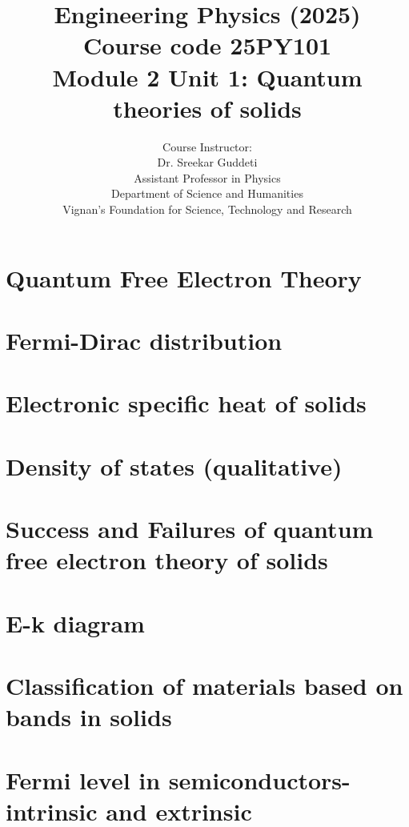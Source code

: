 \documentclass[aspectratio=169]{beamer}
\title[Engineering Physics]{Engineering Physics (2025) \\ Course code
	25PY101 \\ Module 2 Unit 1: Quantum theories of solids}
\author{Course Instructor:\\ 
	{\color{VignanBlue} Dr. Sreekar Guddeti}\\
	Assistant Professor in Physics\\
	Department of Science and Humanities \\
	{\color{VignanRed}Vignan's Foundation for Science, Technology and Research}
}
\newif\ifshowhidden
\begin{document}
	\frame{\titlepage}
	
	\section{Quantum Free Electron Theory}
	
	\section{Fermi-Dirac distribution}
	
	\section{Electronic specific heat of solids}
	
	\section{Density of states (qualitative)}
	
	\section{Success and Failures of quantum free electron theory of solids}
	
	\section{E-k diagram}
	
	\section{Classification of materials based on bands in solids}
	
	\section{Fermi level in semiconductors- intrinsic and extrinsic}
	
\end{document}
